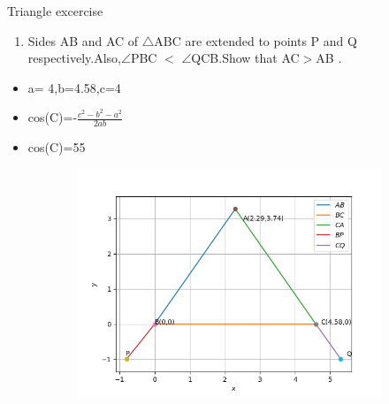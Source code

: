 \begin{frame}{Triangle excercise}
\begin{enumerate}
\item Sides AB and AC of $\triangle$ABC are extended to points P and Q respectively.Also,$\angle$PBC $<$ $\angle$QCB.Show that AC$>$AB .
\begin{center}

\end{center}
\end{enumerate}
\begin{itemize}
\item a= 4,b=4.58,c=4
\item cos(C)=-$\frac{c^2 - b^2 -a^2}{2ab}$
\item cos(C)=55

\seti
\end{itemize}
\end{frame}
\begin{figure}
\begin{center}
\begin{figure}
\includegraphics[scale=.4]{./CODES/triangle/tri_ex.png}
\end{figure}
\end{center}
\end{figure}


